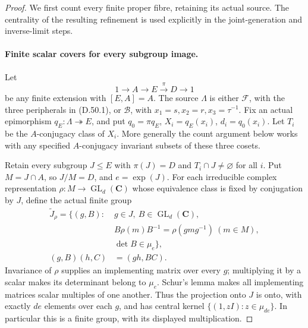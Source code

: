 \begin{proof}
We first count every finite proper fibre, retaining its actual source.
The centrality of the resulting refinement is used explicitly in
the joint-generation and inverse-limit steps.

\paragraph{Finite scalar covers for every subgroup image.}
Let
\[
 1\longrightarrow A\longrightarrow E\xrightarrow{\pi}D\longrightarrow1
 \tag{D.50.5}
\]
be any finite extension with \([E,A]=A\).
The source \(\Lambda\) is either \(\mathcal F\), with the three
peripherals in \textup{(D.50.1)}, or \(\mathcal B\), with
\(x_1=s,x_2=r,x_3=\tau^{-1}\).
Fix an actual epimorphism \(q_E:\Lambda\twoheadrightarrow E\), and put
\(q_0=\pi q_E\), \(X_i=q_E(x_i)\), \(d_i=q_0(x_i)\).
Let \(T_i\) be the \(A\)-conjugacy class of \(X_i\).
More generally the count argument below works with any specified
\(A\)-conjugacy invariant subsets of these three cosets.

Retain every subgroup \(J\leq E\) with \(\pi(J)=D\) and
\(T_i\cap J\ne\varnothing\) for all \(i\).
Put \(M=J\cap A\), so \(J/M=D\), and \(e=\exp(J)\).
For each irreducible complex representation
\(\rho:M\to\operatorname{GL}_d(\mathbf C)\) whose equivalence class
is fixed by conjugation by \(J\), define the actual finite group
\[
 \begin{aligned}
 \widetilde J_\rho=\{(g,B):\;&g\in J,\ B\in\operatorname{GL}_d(\mathbf C),\\
       &B\rho(m)B^{-1}=\rho(gmg^{-1})\ (m\in M),\\
                         &\det B\in\mu_e\},\\
 (g,B)(h,C)&=(gh,BC).
 \end{aligned}
 \tag{D.50.6}
\]
Invariance of \(\rho\) supplies an implementing matrix over every
\(g\); multiplying it by a scalar makes its determinant belong to
\(\mu_e\). Schur's lemma makes all implementing matrices scalar
multiples of one another. Thus the projection onto \(J\) is onto,
with exactly \(de\) elements over each \(g\), and has central kernel
\(\{(1,zI):z\in\mu_{de}\}\). In particular this is a finite group,
with its displayed multiplication.


\end{proof}

